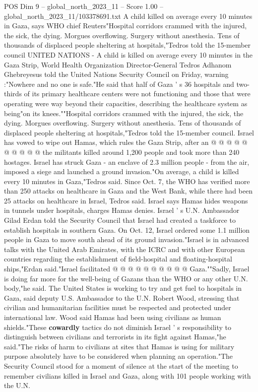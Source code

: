 \begin{textsample}{POS Dim 9 – global\_north\_2023\_11 – Score 1.00 – global\_north\_2023\_11/103378691.txt}  \label{ex:f9_pos_155}
A child killed on average every 10 minutes in Gaza, says WHO chief Reuters"Hospital corridors crammed with the injured, the sick, the dying.
Morgues overflowing.
Surgery without anesthesia.
Tens of thousands of displaced people sheltering at hospitals,"Tedros told the 15-member council UNITED NATIONS - A child is killed on average every 10 minutes in the Gaza Strip, World Health Organization Director-General Tedros Adhanom Ghebreyesus told the United Nations Security Council on Friday, warning :"Nowhere and no one is safe."He said that half of Gaza ' s 36 hospitals and two-thirds of its primary healthcare centers were not functioning and those that were operating were way beyond their capacities, describing the healthcare system as being"on its knees.""Hospital corridors crammed with the injured, the sick, the dying.
Morgues overflowing.
Surgery without anesthesia.
Tens of thousands of displaced people sheltering at hospitals,"Tedros told the 15-member council.
Israel has vowed to wipe out Hamas, which rules the Gaza Strip, after an @ @ @ @ @ @ @ @ @ @ the militants killed around 1,200 people and took more than 240 hostages.
Israel has struck Gaza - an enclave of 2.3 million people - from the air, imposed a siege and launched a ground invasion."On average, a child is killed every 10 minutes in Gaza,"Tedros said.
Since Oct. 7, the WHO has verified more than 250 attacks on healthcare in Gaza and the West Bank, while there had been 25 attacks on healthcare in Israel, Tedros said.
Israel says Hamas hides weapons in tunnels under hospitals, charges Hamas denies.
Israel ' s U.N.
Ambassador Gilad Erdan told the Security Council that Israel had created a taskforce to establish hospitals in southern Gaza.
On Oct. 12, Israel ordered some 1.1 million people in Gaza to move south ahead of its ground invasion."Israel is in advanced talks with the United Arab Emirates, with the ICRC and with other European countries regarding the establishment of field-hospital and floating-hospital ships,"Erdan said."Israel facilitated @ @ @ @ @ @ @ @ @ @ Gaza.""Sadly, Israel is doing far more for the well-being of Gazans than the WHO or any other U.N. body,"he said.
The United States is working to try and get fuel to hospitals in Gaza, said deputy U.S.
Ambassador to the U.N.
Robert Wood, stressing that civilian and humanitarian facilities must be respected and protected under international law.
Wood said Hamas had been using civilians as human shields."These \textbf{cowardly} tactics do not diminish Israel ' s responsibility to distinguish between civilians and terrorists in its fight against Hamas,"he said."The risks of harm to civilians at sites that Hamas is using for military purpose absolutely have to be considered when planning an operation."The Security Council stood for a moment of silence at the start of the meeting to remember civilians killed in Israel and Gaza, along with 101 people working with the U.N.

\end{textsample}
